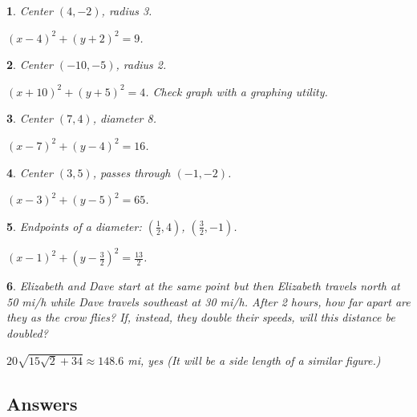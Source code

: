 \documentclass{amsbook}
\newtheorem{exc}{}
\newenvironment{ex}{\begin{exc}\normalfont}{\end{exc}}
\numberwithin{section}{chapter}
\numberwithin{equation}{chapter}
\newcommand{\ds}{\displaystyle}
\begin{document}
\begin{multicols}{2}

	\begin{ex}
	Center $(4,-2)$, radius 3.
	\begin{sol}
		$(x-4)^2+(y+2)^2 = 9$.
	\end{sol}
\end{ex}
	\begin{ex}
	Center $(-10,-5)$, radius 2.
	\begin{sol}
		$(x+10)^2+(y+5)^2 = 4$. Check graph with a graphing utility.
	\end{sol}
\end{ex}
	\begin{ex}
	Center $(7,4)$, diameter 8.
	\begin{sol}
		$(x-7)^2+(y-4)^2 = 16$.
	\end{sol}
\end{ex}
	\begin{ex}
	Center $(3,5)$, passes through $(-1,-2)$.
	\begin{sol}
		$(x-3)^2+(y-5)^2 = 65$.
	\end{sol}
\end{ex}

	\begin{ex}
	Endpoints of a diameter: $\left(\frac{1}{2}, 4\right)$, $\left(\frac{3}{2}, -1\right)$.
	\begin{sol}
		$(x-1)^2+\left(y-\frac{3}{2}\right)^2 = \frac{13}{2}$.
	\end{sol}
\end{ex}
\end{multicols}

\begin{ex}
	Elizabeth and Dave start at the same point but then Elizabeth travels north at 50 mi/h while Dave travels southeast at 30 mi/h. After 2 hours, how far apart are they as the crow flies? If, instead, they double their speeds, will this distance be doubled?
	\begin{sol}
		$\ds 20\sqrt{15\sqrt{2}+34} \approx 148.6$ mi, yes (It will be a side length of a similar figure.)
	\end{sol}
\end{ex}


\subsection*{Answers \nopunct} \hfill
\begin{multicols}{2}
	
\end{multicols}
\end{document}
